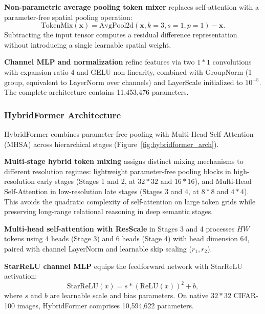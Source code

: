 \textbf{Non-parametric average pooling token mixer} replaces self-attention with a parameter-free spatial pooling operation:
\begin{equation}
\text{TokenMix}(\mathbf{x}) = \text{AvgPool2d}(\mathbf{x}, k=3, s=1, p=1) - \mathbf{x}.
\end{equation}
Subtracting the input tensor computes a residual difference representation without introducing a single learnable spatial weight.

\textbf{Channel MLP and normalization} refine features via two $1*1$ convolutions with expansion ratio 4 and GELU non-linearity, combined with GroupNorm (1 group, equivalent to LayerNorm over channels) and LayerScale initialized to $10^{-5}$. The complete architecture contains 11,453,476 parameters.

\subsubsection{HybridFormer Architecture}
\label{subsubsection:hybridformer}

HybridFormer combines parameter-free pooling with Multi-Head Self-Attention (MHSA) across hierarchical stages (Figure~\ref{fig:hybridformer_arch}).

\textbf{Multi-stage hybrid token mixing} assigns distinct mixing mechanisms to different resolution regimes: lightweight parameter-free pooling blocks in high-resolution early stages (Stages 1 and 2, at $32*32$ and $16*16$), and Multi-Head Self-Attention in low-resolution late stages (Stages 3 and 4, at $8*8$ and $4*4$). This avoids the quadratic complexity of self-attention on large token grids while preserving long-range relational reasoning in deep semantic stages.

\textbf{Multi-head self-attention with ResScale} in Stages 3 and 4 processes $HW$ tokens using 4 heads (Stage 3) and 6 heads (Stage 4) with head dimension 64, paired with channel LayerNorm and learnable skip scaling ($r_1, r_2$).

\textbf{StarReLU channel MLP} equips the feedforward network with StarReLU activation:
\begin{equation}
\text{StarReLU}(x) = s * (\text{ReLU}(x))^2 + b,
\end{equation}
where $s$ and $b$ are learnable scale and bias parameters. On native $32*32$ CIFAR-100 images, HybridFormer comprises 10,594,622 parameters.
